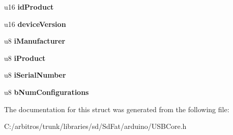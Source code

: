 \begin{DoxyCompactItemize}
\item 
\hypertarget{struct_device_descriptor_a519c2f3b9ade6de6e761b4ada00d31b9}{u16 {\bfseries id\-Product}}\label{struct_device_descriptor_a519c2f3b9ade6de6e761b4ada00d31b9}

\item 
\hypertarget{struct_device_descriptor_a780fae31c7a1fa955206f55f2a069f02}{u16 {\bfseries device\-Version}}\label{struct_device_descriptor_a780fae31c7a1fa955206f55f2a069f02}

\item 
\hypertarget{struct_device_descriptor_aae88465cfdcbe8c3654a5d317ca2a428}{u8 {\bfseries i\-Manufacturer}}\label{struct_device_descriptor_aae88465cfdcbe8c3654a5d317ca2a428}

\item 
\hypertarget{struct_device_descriptor_a038aa24fddd7b42b20976e13392954f2}{u8 {\bfseries i\-Product}}\label{struct_device_descriptor_a038aa24fddd7b42b20976e13392954f2}

\item 
\hypertarget{struct_device_descriptor_ad5cf25949929f3baddc6f1b2751835dc}{u8 {\bfseries i\-Serial\-Number}}\label{struct_device_descriptor_ad5cf25949929f3baddc6f1b2751835dc}

\item 
\hypertarget{struct_device_descriptor_a26db168b352c51f781975b270ee76692}{u8 {\bfseries b\-Num\-Configurations}}\label{struct_device_descriptor_a26db168b352c51f781975b270ee76692}

\end{DoxyCompactItemize}


The documentation for this struct was generated from the following file\-:\begin{DoxyCompactItemize}
\item 
C\-:/arbitros/trunk/libraries/sd/\-Sd\-Fat/arduino/U\-S\-B\-Core.\-h\end{DoxyCompactItemize}
